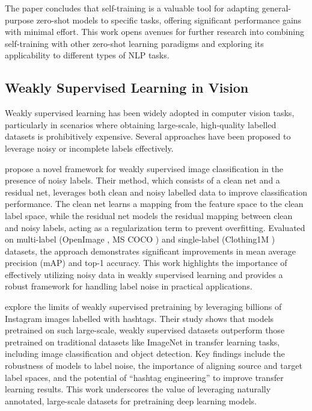 The paper concludes that self-training is a valuable tool for adapting general-purpose zero-shot models to specific tasks, offering significant performance gains with minimal effort. This work opens avenues for further research into combining self-training with other zero-shot learning paradigms and exploring its applicability to different types of NLP tasks.


\subsection{Weakly Supervised Learning in Vision}

Weakly supervised learning has been widely adopted in computer vision tasks, particularly in scenarios where obtaining large-scale, high-quality labelled datasets is prohibitively expensive. Several approaches have been proposed to leverage noisy or incomplete labels effectively.
\newline

\citet{hu_weakly_2019} propose a novel framework for weakly supervised image classification in the presence of noisy labels. Their method, which consists of a clean net and a residual net, leverages both clean and noisy labelled data to improve classification performance. The clean net learns a mapping from the feature space to the clean label space, while the residual net models the residual mapping between clean and noisy labels, acting as a regularization term to prevent overfitting. Evaluated on multi-label (OpenImage \cite{openimages}, MS COCO \cite{lin2015microsoftcococommonobjects}) and single-label (Clothing1M \cite{7298885}) datasets, the approach demonstrates significant improvements in mean average precision (mAP) and top-1 accuracy. This work highlights the importance of effectively utilizing noisy data in weakly supervised learning and provides a robust framework for handling label noise in practical applications.
\newline

\citet{mahajan_exploring_2018} explore the limits of weakly supervised pretraining by leveraging billions of Instagram images labelled with hashtags. Their study shows that models pretrained on such large-scale, weakly supervised datasets outperform those pretrained on traditional datasets like ImageNet in transfer learning tasks, including image classification and object detection. Key findings include the robustness of models to label noise, the importance of aligning source and target label spaces, and the potential of ``hashtag engineering'' to improve transfer learning results. This work underscores the value of leveraging naturally annotated, large-scale datasets for pretraining deep learning models.
\newline

